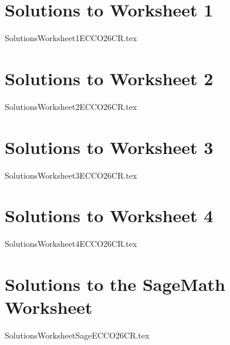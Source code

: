 \documentclass{article}
\begin{document}
\clearpage
\section{Solutions to Worksheet 1}
\begingroup
\let\maketitle\relax
{SolutionsWorksheet1ECCO26CR.tex}
\endgroup

\clearpage
\section{Solutions to Worksheet 2}
\begingroup
\let\maketitle\relax
{SolutionsWorksheet2ECCO26CR.tex}
\endgroup

\clearpage
\section{Solutions to Worksheet 3}
\begingroup
\let\maketitle\relax
{SolutionsWorksheet3ECCO26CR.tex}
\endgroup

\clearpage
\section{Solutions to Worksheet 4}
\begingroup
\let\maketitle\relax
{SolutionsWorksheet4ECCO26CR.tex}
\endgroup

\clearpage
\section{Solutions to the SageMath Worksheet}
\begingroup
\let\maketitle\relax
{SolutionsWorksheetSageECCO26CR.tex}
\endgroup
\end{document}
